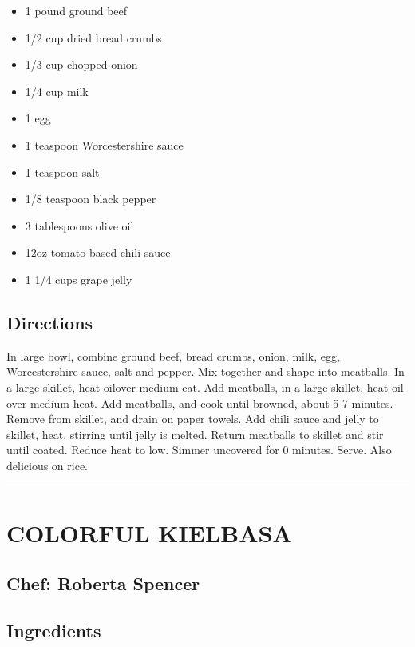 \documentclass[
]{book}
\providecommand{\tightlist}{%
  \setlength{\itemsep}{0pt}\setlength{\parskip}{0pt}}
\begin{document}
\begin{itemize}
\tightlist
\item
  1 pound ground beef
\item
  1/2 cup dried bread crumbs
\item
  1/3 cup chopped onion
\item
  1/4 cup milk
\item
  1 egg
\item
  1 teaspoon Worcestershire sauce
\item
  1 teaspoon salt
\item
  1/8 teaspoon black pepper
\item
  3 tablespoons olive oil
\item
  12oz tomato based chili sauce
\item
  1 1/4 cups grape jelly
\end{itemize}

\hypertarget{directions-50}{%
\subsection*{Directions}\label{directions-50}}


In large bowl, combine ground beef, bread crumbs, onion, milk, egg, Worcestershire sauce, salt and pepper. Mix together and shape into meatballs. In a large skillet, heat oilover medium eat. Add meatballs, in a large skillet, heat oil over medium heat. Add meatballs, and cook until browned, about 5-7 minutes. Remove from skillet, and drain on paper towels. Add chili sauce and jelly to skillet, heat, stirring until jelly is melted. Return meatballs to skillet and stir until coated. Reduce heat to low. Simmer uncovered for 0 minutes. Serve. Also delicious on rice.

\begin{center}\rule{0.5\linewidth}{0.5pt}\end{center}

\hypertarget{colorful-kielbasa}{%
\section*{COLORFUL KIELBASA}\label{colorful-kielbasa}}


\hypertarget{chef-roberta-spencer-18}{%
\subsection*{Chef: Roberta Spencer}\label{chef-roberta-spencer-18}}


\hypertarget{ingredients-51}{%
\subsection*{Ingredients}\label{ingredients-51}}
\end{document}
